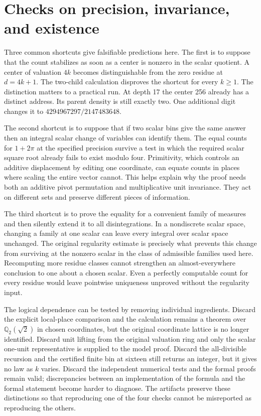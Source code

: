 \documentclass[12pt,letterpaper]{article}
\begin{document}
\section{Checks on precision, invariance, and existence}
Three common shortcuts give falsifiable predictions here. The first is to suppose that the count stabilizes as soon as a center is nonzero in the scalar quotient. A center of valuation $4k$ becomes distinguishable from the zero residue at $d=4k+1$. The two-child calculation disproves the shortcut for every $k\ge1$. The distinction matters to a practical run. At depth 17 the center 256 already has a distinct address. Its parent density is still exactly two. One additional digit changes it to $4294967297/2147483648$.

The second shortcut is to suppose that if two scalar bins give the same answer then an integral scalar change of variables can identify them. The equal counts for $1+2\pi$ at the specified precision survive a test in which the required scalar square root already fails to exist modulo four. Primitivity, which controls an additive displacement by editing one coordinate, can equate counts in places where scaling the entire vector cannot. This helps explain why the proof needs both an additive pivot permutation and multiplicative unit invariance. They act on different sets and preserve different pieces of information.

The third shortcut is to prove the equality for a convenient family of measures and then silently extend it to all disintegrations. In a nondiscrete scalar space, changing a family at one scalar can leave every integral over scalar space unchanged. The original regularity estimate is precisely what prevents this change from surviving at the nonzero scalar in the class of admissible families used here. Recomputing more residue classes cannot strengthen an almost-everywhere conclusion to one about a chosen scalar. Even a perfectly computable count for every residue would leave pointwise uniqueness unproved without the regularity input.

The logical dependence can be tested by removing individual ingredients. Discard the explicit local-place comparison and the calculation remains a theorem over $\mathbb Q_2(\sqrt2)$ in chosen coordinates, but the original coordinate lattice is no longer identified. Discard unit lifting from the original valuation ring and only the scalar one-unit representative is supplied to the model proof. Discard the all-divisible recursion and the certified finite bin at sixteen still returns an integer, but it gives no law as $k$ varies. Discard the independent numerical tests and the formal proofs remain valid; discrepancies between an implementation of the formula and the formal statement become harder to diagnose. The artifacts preserve these distinctions so that reproducing one of the four checks cannot be misreported as reproducing the others.
\end{document}
